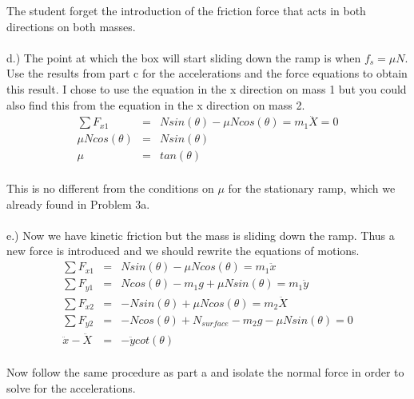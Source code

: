 \documentclass[11pt]{amsart}
\begin{document}
The student forget the introduction of the friction force that acts in both directions on both masses. \\ \\
d.) The point at which the box will start sliding down the ramp is when $f_{s} = \mu{N}$. Use the results from part c for the accelerations and the force equations to obtain this result. I chose to use the equation in the x direction on mass 1 but you could also find this from the equation in the x direction on mass 2. \\ 
\begin{eqnarray*}
\sum{F_{x1}} &=& Nsin(\theta) - \mu{N}cos(\theta) = m_{1}\ddot{X}  = 0 \\
\mu{N}cos(\theta) &=& Nsin(\theta) \\
\mu &=& tan(\theta) 
\end{eqnarray*} \\
This is no different from the conditions on $\mu$ for the stationary ramp, which we already found in Problem 3a. \\ \\
e.) Now we have kinetic friction but the mass is sliding down the ramp. Thus a new force is introduced and we should rewrite the equations of motions. \\
\begin{eqnarray*}
\sum{F_{x1}} &=& Nsin(\theta)-\mu{N}cos(\theta) = m_{1}\ddot{x} \\
\sum{F_{y1}} &=& Ncos(\theta)-m_{1}g +\mu{N}sin(\theta)= m_{1}\ddot{y} \\
\sum{F_{x2}} &=& -Nsin(\theta)+\mu{N}cos(\theta) = m_{2}\ddot{X} \\
\sum{F_{y2}} &=& -Ncos(\theta)+N_{surface}-m_{2}g -\mu{N}sin(\theta)=0 \\
\ddot{x}-\ddot{X} &=& -\ddot{y}cot(\theta)  
\end{eqnarray*} \\
Now follow the same procedure as part a and isolate the normal force in order to solve for the accelerations. \\
\end{document}
